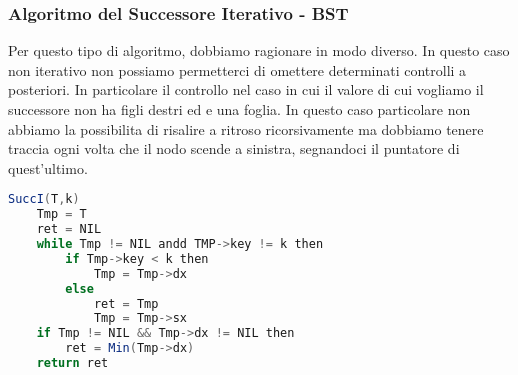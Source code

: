 \subsubsection{Algoritmo del Successore Iterativo - BST}

Per questo tipo di algoritmo, dobbiamo ragionare in modo diverso. In questo caso non iterativo non possiamo permetterci di omettere determinati controlli a posteriori. In particolare il controllo nel caso in cui il valore di cui vogliamo il successore non ha figli destri ed e una foglia. In questo caso particolare non abbiamo la possibilita di risalire a ritroso ricorsivamente ma dobbiamo tenere traccia ogni volta che il nodo scende a sinistra, segnandoci il puntatore di quest'ultimo.

\begin{lstlisting}[language=Java]
	SuccI(T,k)
	Tmp = T
	ret = NIL
	while Tmp != NIL andd TMP->key != k then
		if Tmp->key < k then
			Tmp = Tmp->dx
		else 
			ret = Tmp
			Tmp = Tmp->sx
	if Tmp != NIL && Tmp->dx != NIL then
		ret = Min(Tmp->dx)
	return ret
\end{lstlisting}